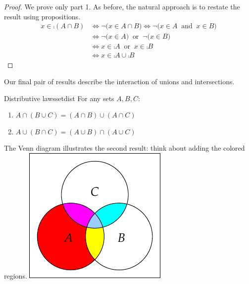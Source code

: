 \begin{proof}
	We prove only part 1. As before, the natural approach is to restate the result using propositions.
	\begin{align*}
		x\in\comp{(A\cap B)}&\iff \neg\bigl(x\in A\cap B\bigr) \iff \neg\bigl(x\in A\ \text{ and }\  x\in B\bigr)\\
		&\iff \neg\bigl(x\in A\bigr)\ \text{ or }\ \neg\bigl(x\in B\bigr) \tag*{(de Morgan's first law of logic)}\\
		&\iff x\in\comp A\ \text{ or }\ x\in\comp B\\
		&\iff x\in\comp A\cup\comp B\tag*{\qedhere}
	\end{align*}
\end{proof}

Our final pair of results describe the interaction of unions and intersections.\par

\begin{thm}[lower separated=false, sidebyside, sidebyside align=top seam, sidebyside gap=0pt, righthand width=0.3\linewidth]{Distributive laws}{setdist}
	For any sets $A,B,C$:
	\begin{enumerate}\setlength{\itemsep}{2pt}
		\item $A\cap(B\cup C)=(A\cap B)\cup(A\cap C)$
		\item $A\cup(B\cap C)=(A\cup B)\cap(A\cup C)$
	\end{enumerate}
	The Venn diagram illustrates the second result: think about adding the colored regions.
	\tcblower
	\flushright\includegraphics{sets-07-venndist}
\end{thm}


